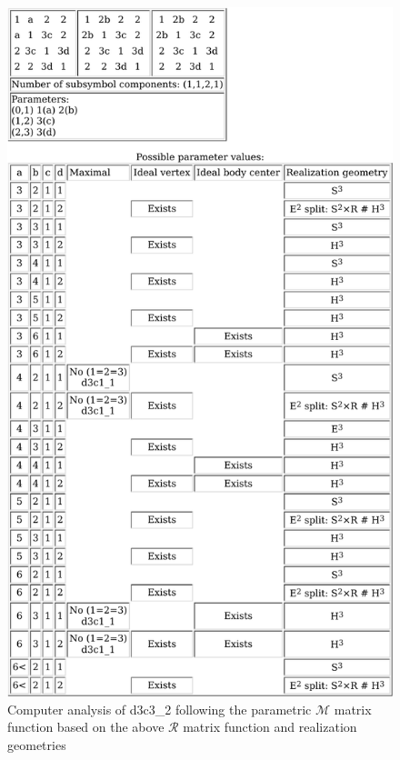 \documentclass[12pt,a4paper]{article}
\numberwithin{equation}{section}
\theoremstyle{plain}%
\theoremstyle{definition}
\theoremstyle{remark}
\begin{document}
\begin{figure}
  \caption{\label{fig:d3c3_2_pm} Computer analysis of d3c3\_2 following the parametric
  $\mathcal{M}$ matrix function based on the above $\mathcal{R}$ matrix
  function and realization geometries}
  \includegraphics[width=\textwidth,height=0.9\textheight,keepaspectratio]{d3c3_2_analysis.pdf}

\end{figure}
\end{document}
